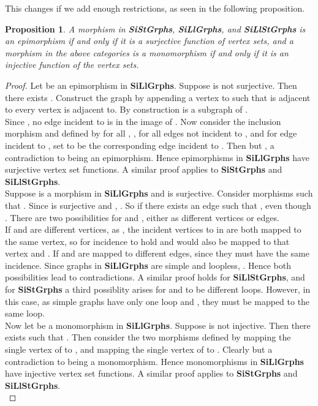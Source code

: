 \documentclass[11pt]{article}
\newtheorem{proposition}[theorem]{Proposition}
\begin{document}
\indent This changes if we add enough restrictions, as seen in the following proposition.
\begin{proposition}
A morphism in \textbf{SiStGrphs}, \textbf{SiLlGrphs}, and \textbf{SiLlStGrphs} is an epimorphism if and only if it is a surjective function of vertex sets, and a morphism in the above categories is a monomorphism if and only if it is an injective function of the vertex sets.
\end{proposition}
\begin{proof}
Let  be an epimorphism in \textbf{SiLlGrphs}. Suppose  is not surjective. Then there exists . Construct the graph  by appending a vertex  to  such that  is adjacent to every vertex  is adjacent to. By construction  is a subgraph of .\\
\indent Since , no edge incident to  is in the image of . Now consider  the inclusion morphism and  defined by  for all , ,  for all edges  not incident to , and for edge  incident to , set  to be the corresponding edge incident to . Then  but , a contradiction to  being an epimorphism. Hence epimorphisms in \textbf{SiLlGrphs} have surjective vertex set functions. A similar proof applies to \textbf{SiStGrphs} and \textbf{SiLlStGrphs}.\\
\indent Suppose  is a morphism in \textbf{SiLlGrphs} and  is surjective. Consider morphisms  such that . Since  is surjective and , . So if  there exists an edge  such that , even though . There are two possibilities for  and , either as different vertices or edges.\\
\indent If  and  are different vertices, as , the incident vertices to  in  are both mapped to the same vertex, so for incidence to hold  and  would also be mapped to that vertex and . If  and  are mapped to different edges, since  they must have the same incidence. Since graphs in \textbf{SiLlGrphs} are simple and loopless, . Hence both possibilities lead to contradictions.
A similar proof holds for \textbf{SiLlStGrphs}, and for \textbf{SiStGrphs} a third possiblity arises for  and  to be different loops. However, in this case, as simple graphs have only one loop and , they must be mapped to the same loop.\\
\indent Now let  be a monomorphism in \textbf{SiLlGrphs}. Suppose  is not injective. Then there exists  such that . Then consider the two morphisms  defined by  mapping the single vertex of  to , and  mapping the single vertex of  to . Clearly  but  a contradiction to  being a monomorphism. Hence monomorphisms in \textbf{SiLlGrphs} have injective vertex set functions. A similar proof applies to \textbf{SiStGrphs} and \textbf{SiLlStGrphs}.\\

\end{proof}
\end{document}

